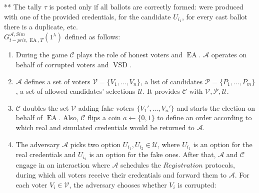 \documentclass[12pt]{article}
\DeclareMathOperator{\vsd}{VSD}
\DeclareMathOperator{\ea}{EA}
\begin{document}
** The tally $\tau$ is posted only if all ballots are correctly formed: were produced with one of the provided credentials, for the candidate $U_{i_1}$, for every cast ballot there is a duplicate, etc. \\

 $G_{t-priv,\ea,T}^{\mathcal{A}, Sim}(1^{\lambda})$ defined as follows:\\
\begin{enumerate}
\item During the game $\mathcal{C}$ plays the role of honest voters and $\ea$. $\mathcal{A}$ operates on behalf of corrupted voters and $\vsd$. 
\item $\mathcal{A}$ defines a set of voters  $\mathcal{V} = \{V_1,...,V_n\}$, a list of candidates  $\mathcal{P} = \{P_1,...,P_m\}$, a set of allowed candidates' selections $\mathcal{U}$.  It provides $\mathcal{C}$ with $\mathcal{V}, \mathcal{P}, \mathcal{U}$.
\item $\mathcal{C}$ doubles the set $\mathcal{V}$ adding fake voters $ \{V_1',...,V_n'\}$ and starts the election on behalf of $\ea$. Also, $\mathcal{C}$ flips a coin $a \leftarrow \{0,1\}$ to define an order according to which real and simulated credentials would be returned to $\mathcal{A}$. 
\item The adversary $\mathcal{A}$ picks two option $U_{i_1},U_{i_2} \in \mathcal{U}$, where $U_{i_1}$ is an option for the real credentials and $U_{i_2}$ is an option for the fake ones.  After that, $\mathcal{A}$  and $\mathcal{C}$ engage in an interaction where $\mathcal{A}$ schedules the $Registration$ protocols, during which all voters receive their credentials and forward them to  $\mathcal{A}$. For each voter $V_i \in \mathcal{V}$, the adversary chooses whether $V_i$ is corrupted:
\end{enumerate}
\end{document}
